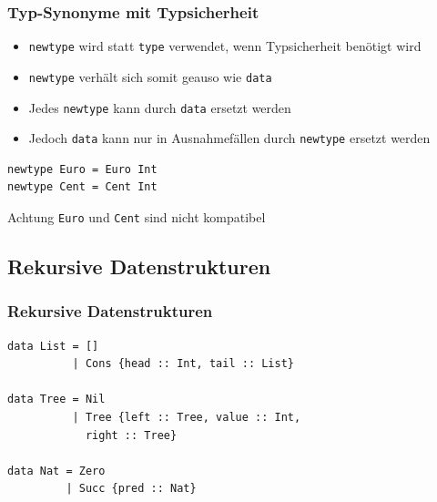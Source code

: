 \documentclass[fleqn,11pt,aspectratio=43]{beamer}
\begin{document}
\begin{frame}[fragile]
\frametitle{Typ-Synonyme mit Typsicherheit} 
\begin{block}{\vspace*{-3ex}}
\begin{itemize}
\item \lstinline|newtype| wird statt \lstinline|type| verwendet, wenn Typsicherheit benötigt wird
\item \lstinline|newtype| verhält sich somit geauso wie \lstinline|data|
\item Jedes \lstinline|newtype| kann durch \lstinline|data| ersetzt werden
\item Jedoch \lstinline|data| kann nur in Ausnahmefällen durch \lstinline|newtype| ersetzt werden
\end{itemize}
\end{block}
\pause
\begin{lstlisting}
newtype Euro = Euro Int
newtype Cent = Cent Int
\end{lstlisting}
\begin{alertblock}{Achtung}
\lstinline|Euro| und \lstinline|Cent| sind nicht kompatibel
\end{alertblock}
\end{frame}

\subsection{Rekursive Datenstrukturen}

\begin{frame}[fragile]
\frametitle{Rekursive Datenstrukturen} 
\begin{lstlisting}
data List = []
          | Cons {head :: Int, tail :: List}

data Tree = Nil
          | Tree {left :: Tree, value :: Int,
            right :: Tree}
          
data Nat = Zero
         | Succ {pred :: Nat}

\end{lstlisting}
\end{frame}
\end{document}
